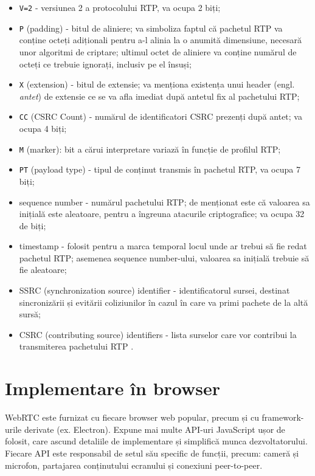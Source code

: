 \begin{itemize}
    \item \texttt{V=2} - versiunea 2 a protocolului RTP, va ocupa 2 biți;
    \item \texttt{P} (padding) - bitul de aliniere; va simboliza faptul că pachetul RTP va conține octeți adiționali pentru a-l alinia la o anumită dimensiune, necesară unor algoritmi de criptare; ultimul octet de aliniere va conține numărul de octeți ce trebuie ignorați, inclusiv pe el însuși;
    \item \texttt{X} (extension) - bitul de extensie; va menționa existența unui header (engl. \textit{antet}) de extensie ce se va afla imediat după antetul fix al pachetului RTP;
    \item \texttt{CC} (CSRC Count) - numărul de identificatori CSRC prezenți după antet; va ocupa 4 biți;
    \item \texttt{M} (marker): bit a cărui interpretare variază în funcție de profilul RTP;
    \item \texttt{PT} (payload type) - tipul de conținut transmis în pachetul RTP, va ocupa 7 biți;
    \item sequence number - numărul pachetului RTP; de menționat este că valoarea sa inițială este aleatoare, pentru a îngreuna atacurile criptografice; va ocupa 32 de biți;
    \item timestamp - folosit pentru a marca temporal locul unde ar trebui să fie redat pachetul RTP; asemenea sequence number-ului, valoarea sa inițială trebuie să fie aleatoare;
    \item SSRC (synchronization source) identifier - identificatorul sursei, destinat sincronizării și evitării coliziunilor în cazul în care va primi pachete de la altă sursă;
    \item CSRC (contributing source) identifiers - lista surselor care vor contribui la transmiterea pachetului RTP \cite{rfc3550}.
\end{itemize}

\section{Implementare în browser}
\label{sec:ch3sec4}
\indent \par WebRTC este furnizat cu fiecare browser web popular, precum și cu framework-urile derivate (ex. Electron). Expune mai multe API-uri JavaScript ușor de folosit, care ascund detaliile de implementare și simplifică munca dezvoltatorului. Fiecare API este responsabil de setul său specific de funcții, precum: cameră și microfon, partajarea conținutului ecranului și conexiuni peer-to-peer.

